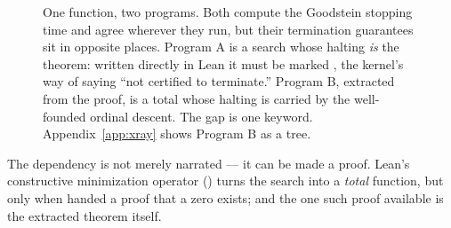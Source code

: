 \documentclass[11pt]{article}
\begin{document}
\begin{figure}[h]
\centering
{}
\caption{One function, two programs. Both compute the Goodstein stopping time and
agree wherever they run, but their termination guarantees sit in opposite places.
Program A is a search whose halting \emph{is} the theorem: written directly in
Lean it must be marked , the kernel's way of saying ``not certified
to terminate.'' Program B, extracted from the proof, is a total  whose
halting is carried by the well-founded ordinal descent. The gap is one keyword.
Appendix~\ref{app:xray} shows Program B as a tree.}
\label{fig:search}
\end{figure}

The dependency is not merely narrated --- it can be made a proof. Lean's
constructive minimization operator () turns the search into a
\emph{total} function, but only when handed a proof that a zero exists; and the
one such proof available is the extracted theorem itself.
\end{document}
